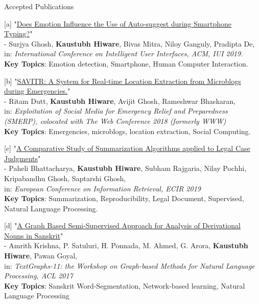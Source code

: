 \documentclass{resume} %
\begin{document}
\begin{rSection}{Accepted Publications}

[a] "\href{https://iui.acm.org/2019/acceptedpapers.html#shortpapers}{Does Emotion Influence the Use of Auto-suggest during Smartphone Typing?}" \\
- Surjya Ghosh, \textbf{Kaustubh Hiware}, Bivas Mitra, Niloy Ganguly, Pradipta De,\\
in: \textit{International Conference on Intelligent User Interfaces, ACM, IUI 2019.} \\
\textbf{\small Key Topics}: Emotion detection, Smartphone, Human Computer Interaction.

[b] "\href{https://www2018.thewebconf.org/proceedings/#wrk-131}{SAVITR: A System for Real-time Location Extraction from Microblogs during Emergencies.}" \\
- Ritam Dutt, \textbf{Kaustubh Hiware}, Avijit Ghosh, Rameshwar Bhaskaran, \\
in: \textit{Exploitation of Social Media for Emergency Relief and Preparedness (SMERP), colocated with The Web Conference 2018 (formerly WWW)}\\
\textbf{\small Key Topics}: Emergencies, microblogs, location extraction, Social Computing.

[c] "\href{https://ecir2019.org/accepted-papers/#reproducibilitypapers}{A Comparative Study of Summarization Algorithms applied to Legal Case Judgments}" \\
- Paheli Bhattacharya, \textbf{Kaustubh Hiware}, Subham Rajgaria, Nilay Pochhi, Kripabandhu Ghosh, Saptarshi Ghosh,\\
in: \textit{European Conference on Information Retrieval, ECIR 2019} \\
\textbf{\small Key Topics}: Summarization, Reproducibility, Legal Document, Supervised, Natural Language Processing.

[d] "\href{http://www.aclweb.org/anthology/W17-2409}{A Graph Based Semi-Supervised Approach for Analysis of Derivational Nouns in Sanskrit}" \\
- Amrith Krishna, P. Satuluri, H. Ponnada, M. Ahmed, G. Arora, \textbf{Kaustubh Hiware}, Pawan Goyal, \\
in: \textit{TextGraphs-11: the Workshop on Graph-based Methods for Natural Language Processing, ACL 2017}\\
\textbf{\small Key Topics}: Sanskrit Word-Segmentation, Network-based learning, Natural Language Processing

\end{rSection}
\end{document}
